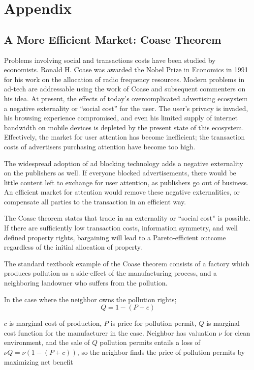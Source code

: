 \documentclass[11pt]{article}
\begin{document}
\section{Appendix}
\label{sec-8}
\subsection{A More Efficient Market: Coase Theorem}
\label{sec-8-1}

Problems involving social and transactions costs have been studied by
economists. Ronald H. Coase was awarded the Nobel Prize in Economics
in 1991 for his work on the allocation of radio frequency resources.\cite{19}
Modern problems in ad-tech are addressable using the work of Coase and
subsequent commenters on his idea. At present, the effects of today’s
overcomplicated advertising ecosystem a negative externality or
“social cost” for the user. The user’s privacy is invaded, his
browsing experience compromised, and even his limited supply of
internet bandwidth on mobile devices is depleted by the present state
of this ecosystem. Effectively, the market for user attention has
become inefficient; the transaction costs of advertisers purchasing
attention have become too high. 

The widespread adoption of ad blocking technology adds a negative
externality on the publishers as well. If everyone blocked
advertisements, there would be little content left to exchange for
user attention, as publishers go out of business. An efficient market
for attention would remove these negative externalities, or compensate
all parties to the transaction in an efficient way. 

The Coase theorem states that trade in an externality or “social cost”
is possible. If there are sufficiently low transaction costs,
information symmetry, and well defined property rights, bargaining
will lead to a Pareto-efficient outcome regardless of the initial
allocation of property. 

The standard textbook example of the Coase theorem consists of a
factory which produces pollution as a side-effect of the manufacturing
process, and a neighboring landowner who suffers from the pollution. 

In the case where the neighbor owns the pollution rights;
  \[ Q= 1-(P + c) \]

$c$ is marginal cost of production, $P$ is price for pollution permit, $Q$ is marginal cost 
function for the manufacturer in the case. Neighbor has valuation $ \nu $ for clean environment,  and the sale of $Q$ pollution permits entails a loss of $ \nu Q = \nu(1-(P+c))$, so the neighbor finds the price of pollution permits by maximizing net benefit 
\end{document}
